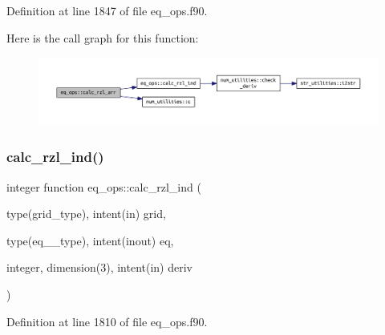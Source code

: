 Definition at line 1847 of file eq\+\_\+ops.\+f90.

Here is the call graph for this function\+:
\nopagebreak
\begin{figure}[H]
\begin{center}
\leavevmode
\includegraphics[width=350pt]{namespaceeq__ops_a366f4cef2390a357f73e73ca56a57497_cgraph}
\end{center}
\end{figure}
\mbox{\label{namespaceeq__ops_a42524ab0697a7a986e2f86c4c75cdc33}} 
\subsubsection{\texorpdfstring{calc\+\_\+rzl\+\_\+ind()}{calc\_rzl\_ind()}}
{\footnotesize\ttfamily integer function eq\+\_\+ops\+::calc\+\_\+rzl\+\_\+ind (\begin{DoxyParamCaption}\item[{type(grid\+\_\+type), intent(in)}]{grid,  }\item[{type(eq\+\_\+2\+\_\+type), intent(inout)}]{eq,  }\item[{integer, dimension(3), intent(in)}]{deriv }\end{DoxyParamCaption})}



Definition at line 1810 of file eq\+\_\+ops.\+f90.

